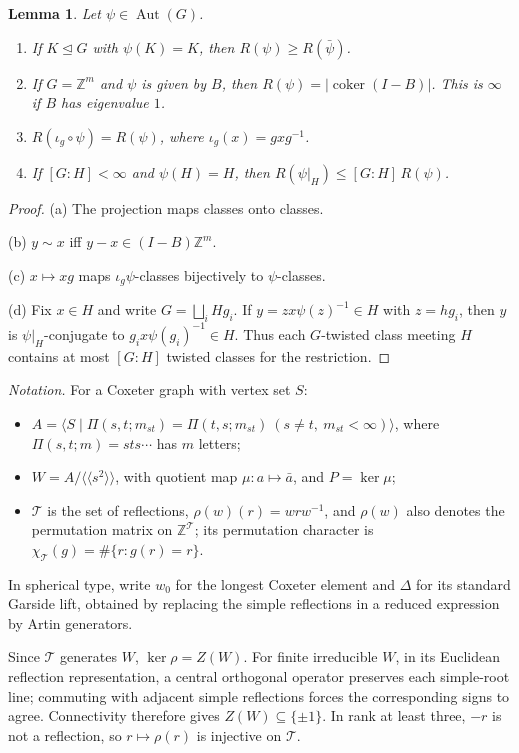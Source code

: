 \documentclass[11pt]{article}
\newtheorem{lemma}[theorem]{Lemma}
\theoremstyle{definition}
\newcommand{\Z}{\mathbb{Z}}
\newcommand{\T}{\mathcal{T}}
\newcommand{\Aut}{\operatorname{Aut}}
\newcommand{\coker}{\operatorname{coker}}
\begin{document}
\begin{lemma}\label{lem:reid}
Let $\psi\in\Aut(G)$.
\begin{enumerate}[label=(\alph*)]
\item If $K\trianglelefteq G$ with $\psi(K)=K$, then $R(\psi)\ge R(\bar\psi)$.
\item If $G=\Z^m$ and $\psi$ is given by $B$, then $R(\psi)=|\coker(I-B)|$. This is $\infty$ if $B$ has eigenvalue $1$.
\item $R(\iota_g\circ\psi)=R(\psi)$, where $\iota_g(x)=gxg^{-1}$.
\item If $[G:H]<\infty$ and $\psi(H)=H$, then $R(\psi|_H)\le[G:H]\,R(\psi)$.
\end{enumerate}
\end{lemma}
\begin{proof}
(a) The projection maps classes onto classes.

(b) $y\sim x$ iff $y-x\in(I-B)\Z^m$.

(c) $x\mapsto xg$ maps $\iota_g\psi$-classes bijectively to $\psi$-classes.

(d) Fix $x\in H$ and write $G=\bigsqcup_iHg_i$. If $y=zx\psi(z)^{-1}\in H$ with $z=hg_i$, then $y$ is $\psi|_H$-conjugate to
$g_ix\psi(g_i)^{-1}\in H$. Thus each $G$-twisted class meeting $H$ contains at most
$[G:H]$ twisted classes for the restriction.
\end{proof}

\emph{Notation.} For a Coxeter graph with vertex set $S$:
\begin{itemize}
\item $A=\langle S\mid\Pi(s,t;m_{st})=\Pi(t,s;m_{st})\ (s\ne t,\ m_{st}<\infty)\rangle$, where $\Pi(s,t;m)=sts\cdots$
has $m$ letters;
\item $W=A/\langle\!\langle s^2\rangle\!\rangle$, with quotient map $\mu\colon a\mapsto\bar a$, and $P=\ker\mu$;
\item $\T$ is the set of reflections, $\rho(w)(r)=wrw^{-1}$, and $\rho(w)$ also denotes the permutation matrix on
$\Z^\T$; its permutation character is $\chi_\T(g)=\#\{r:g(r)=r\}$.
\end{itemize}
In spherical type, write $w_0$ for the longest Coxeter element and $\Delta$ for its standard
Garside lift, obtained by replacing the simple reflections in a reduced expression by Artin generators.

Since $\T$ generates $W$, $\ker\rho=Z(W)$. For finite irreducible $W$, in its Euclidean reflection
representation, a central orthogonal operator preserves each simple-root line; commuting with adjacent simple
reflections forces the corresponding signs to agree. Connectivity therefore gives $Z(W)\subseteq\{\pm1\}$.
In rank at least three, $-r$ is not a reflection, so
$r\mapsto\rho(r)$ is injective on $\T$.
\end{document}
